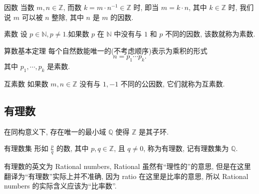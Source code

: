 \documentclass[cn,toc=twocol]{elegantbook}
\newcommand{\N}{\mathbb{N}}
\newcommand{\Z}{\mathbb{Z}}
\newcommand{\Q}{\mathbb{Q}}
\begin{document}


\begin{definition}{因数}
当数 $m, n \in \Z$, 而数 $k=m\cdot n^{-1} \in \Z$ 时, 即当 $m =k\cdot n$, 其中 $k \in \Z$ 时, 我们说 $m$ 可以被 $n$ 整除, 其中 $n$ 是 $m$ 的因数.
\end{definition}

\begin{definition}{素数}
设 $p\in\N ,  p\neq 1$.如果数 $p$ 在 $\N$ 中没有与 $1$ 和 $p$ 不同的因数, 该数就称为素数.
\end{definition}

\begin{theorem}{算数基本定理}
每个自然数能唯一的(不考虑顺序)表示为乘积的形式
\[
	n = p_1 \cdots p_k.
\]
其中 $p_1, \cdots , p_k$ 是素数.
\end{theorem}

\begin{definition}{互素数}
如果数 $m, n \in \Z$ 没有与 $1, -1$ 不同的公因数, 它们就称为互素数.
\end{definition}


\subsection{有理数}

\begin{theorem}
	在同构意义下, 存在唯一的最小域 $\Q$ 使得 $\Z$ 是其子环.
\end{theorem}


\begin{definition}{有理数集}
形如 $\frac{p}{q}$ 的数, 其中 $p, q\in\Z$, 且 $q\neq 0$, 称为有理数, 记有理数集为 $\Q$.
\end{definition}
\begin{remark}
有理数的英文为 Rational numbers, Rational 虽然有“理性的”的意思, 但是在这里翻译为“有理数”实际上并不准确, 因为 ratio 在这里是比率的意思, 所以 Rational numbers 的实际含义应该为“比率数”. 
\end{remark}


\end{document}
